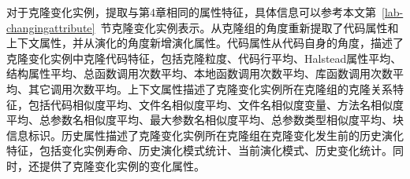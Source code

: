 对于克隆变化实例，提取与第4章相同的属性特征，具体信息可以参考本文第~\ref{lab-changingattribute}~节克隆变化实例表示。从克隆组的角度重新提取了代码属性和上下文属性，并从演化的角度新增演化属性。代码属性从代码自身的角度，描述了克隆变化实例中克隆代码特征，包括克隆粒度、代码行平均、Halstead属性平均、结构属性平均、总函数调用次数平均、本地函数调用次数平均、库函数调用次数平均、其它调用次数平均。上下文属性描述了克隆变化实例所在克隆组的克隆关系特征，包括代码相似度平均、文件名相似度平均、文件名相似度变量、方法名相似度平均、总参数名相似度平均、最大参数名相似度平均、总参数类型相似度平均、块信息标识。历史属性描述了克隆变化实例所在克隆组在克隆变化发生前的历史演化特征，包括变化实例寿命、历史演化模式统计、当前演化模式、历史变化统计。同时，还提供了克隆变化实例的变化属性。



